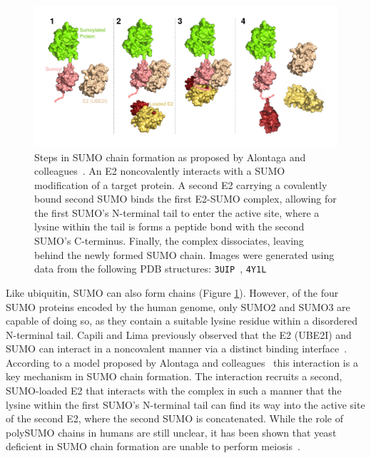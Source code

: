 \begin{figure}[h!]
	\centering
	\includegraphics[width=\textwidth]{img/sumo_chaining.pdf}
	\caption{Steps in SUMO chain formation as proposed by Alontaga and colleagues~\cite{alontaga_rwd_2015}. An E2 noncovalently interacts with a SUMO modification of a target protein. A second E2 carrying a covalently bound second SUMO binds the first E2-SUMO complex, allowing for the first SUMO's N-terminal tail to enter the active site, where a lysine within the tail is forms a peptide bond with the second SUMO's C-terminus. Finally, the complex dissociates, leaving behind the newly formed SUMO chain. Images were generated using data from the following PDB structures: \texttt{3UIP}~\cite{gareau_determinants_2012}, \texttt{4Y1L}~\cite{alontaga_rwd_2015}}
	\label{fig:sumo_chaining}
\end{figure}

Like ubiquitin, SUMO can also form chains (Figure \ref{fig:sumo_chaining}). However, of the four SUMO proteins encoded by the human genome, only SUMO2 and SUMO3 are capable of doing so, as they contain a suitable lysine residue within a disordered N-terminal tail. Capili and Lima previously observed that the E2 (UBE2I) and SUMO can interact in a noncovalent manner via a distinct binding interface~\cite{capili_structure_2007}. According to a model proposed by Alontaga and colleagues~\cite{alontaga_rwd_2015} this interaction is a key mechanism in SUMO chain formation. The interaction recruits a second, SUMO-loaded E2 that interacts with the complex in such a manner that the lysine within the first SUMO's N-terminal tail can find its way into the active site of the second E2, where the second SUMO is concatenated. While the role of polySUMO chains in humans are still unclear, it has been shown that yeast deficient in SUMO chain formation are unable to perform meiosis~\cite{cheng_sumo_2006}.

